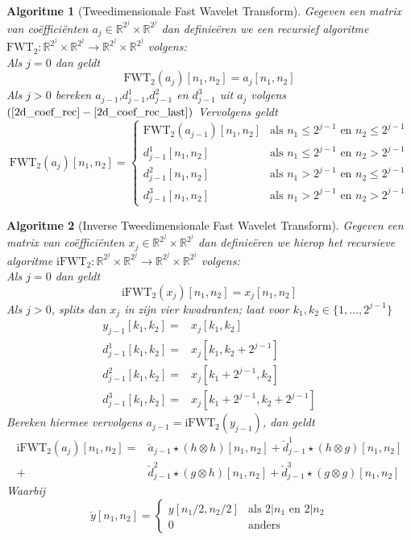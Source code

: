 \documentclass[11pt]{uvamath}
\newcommand{\R}{\mathbb{R}}
\theoremstyle{plain}
\newtheorem*{algo}{Algoritme}
\theoremstyle{definition}
\theoremstyle{remark}
\begin{document}
\begin{algo}[Tweedimensionale Fast Wavelet Transform]
  Gegeven een matrix van co\"effici\"enten $a_j\in\R^{2^j}\times\R^{2^j}$ dan definie\"eren
  we een recursief algoritme $\mathrm{FWT}_2:\R^{2^j}\times\R^{2^j}\to\R^{2^j}\times\R^{2^j}$
  volgens:\\
  Als $j=0$ dan geldt
  \[
  \mathrm{FWT}_2(a_j)[n_1,n_2] = a_j[n_1,n_2]
  \]
  Als $j>0$ bereken $a_{j-1}$,$d^1_{j-1}$,$d^2_{j-1}$ en $d^3_{j-1}$ uit $a_{j}$
  volgens $(\ref{2d_coef_rec}-\ref{2d_coef_rec_last})$
  Vervolgens geldt
  \begin{equation}
    \label{FWTd_def}
  \mathrm{FWT}_2(a_j)[n_1,n_2] = \begin{cases}
    \mathrm{FWT}_2(a_{j-1})[n_1,n_2] & \text{als } n_1 \leq 2^{j-1} \text{ en } n_2 \leq 2^{j-1}\\
    d^1_{j-1}[n_1,n_2]
    & \text{als } n_1\leq 2^{j-1} \text{ en } n_2>2^{j-1} \\
    d^2_{j-1}[n_1,n_2]
    & \text{als } n_1>2^{j-1} \text{ en } n_2\leq 2^{j-1} \\
    d^3_{j-1}[n_1,n_2] & \text{als } n_1>2^{j-1} \text{ en } n_2>2^{j-1} \end{cases}
  \end{equation}
\end{algo}
\begin{algo}[Inverse Tweedimensionale Fast Wavelet Transform]
  Gegeven een matrix van  co\"effici\"enten $x_j\in\R^{2^j}\times\R^{2^j}$ dan definie\"eren we hierop het recursieve
  algoritme $\mathrm{iFWT}_2:\R^{2^j}\times\R^{2^j}\to\R^{2^j}\times\R^{2^j}$ volgens:\\
  Als $j=0$ dan geldt
  \[
  \mathrm{iFWT}_2(x_j)[n_1,n_2] = x_j[n_1,n_2]
  \]
  Als $j>0$, splits dan $x_j$ in zijn vier kwadranten; laat voor $k_1,k_2\in \{1,\ldots,2^{j-1}\}$
  \begin{eqnarray*}
    y_{j-1}[k_1,k_2]   =& x_j[k_1,k_2] \\
    d^1_{j-1}[k_1,k_2] =& x_j[k_1,k_2+2^{j-1}] \\
    d^2_{j-1}[k_1,k_2] =& x_j[k_1+2^{j-1},k_2] \\
    d^3_{j-1}[k_1,k_2] =& x_j[k_1+2^{j-1},k_2+2^{j-1}]
  \end{eqnarray*}
  Bereken hiermee vervolgens $a_{j-1} = \mathrm{iFWT}_2(y_{j-1})$,
  dan geldt
  \begin{equation}
    \label{iFWTd_def}
    \begin{split}
      \mathrm{iFWT}_2(a_j)[n_1,n_2] =& \breve{a}_{j-1} \star (h \otimes h)[n_1,n_2] 
      + \breve{d}_{j-1}^1 \star (h \otimes g)[n_1,n_2] \\
      +& \breve{d}_{j-1}^2 \star (g \otimes h)[n_1,n_2] 
      + \breve{d}_{j-1}^3 \star (g \otimes g)[n_1,n_2]
    \end{split}
  \end{equation}
  Waarbij 
  \[
  \breve y [n_1,n_2] = \begin{cases} 
    y[n_1/2,n_2/2] & \text{als } 2|n_1 \text{ en } 2|n_2 \\ 
    0 &\text{anders}\end{cases}
  \]
\end{algo}
\end{document}
